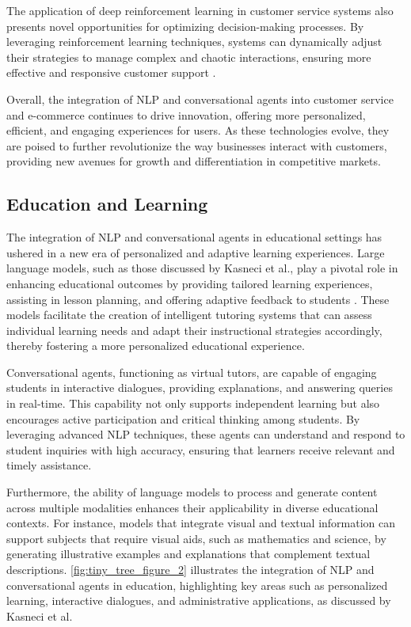 The application of deep reinforcement learning in customer service systems also presents novel opportunities for optimizing decision-making processes. By leveraging reinforcement learning techniques, systems can dynamically adjust their strategies to manage complex and chaotic interactions, ensuring more effective and responsive customer support \cite{vashishtha2019restoringchaosusingdeep}.



Overall, the integration of NLP and conversational agents into customer service and e-commerce continues to drive innovation, offering more personalized, efficient, and engaging experiences for users. As these technologies evolve, they are poised to further revolutionize the way businesses interact with customers, providing new avenues for growth and differentiation in competitive markets.




\subsection{Education and Learning} \label{subsec:Education and Learning}

The integration of NLP and conversational agents in educational settings has ushered in a new era of personalized and adaptive learning experiences. Large language models, such as those discussed by Kasneci et al., play a pivotal role in enhancing educational outcomes by providing tailored learning experiences, assisting in lesson planning, and offering adaptive feedback to students \cite{kasneci2023chatgpt}. These models facilitate the creation of intelligent tutoring systems that can assess individual learning needs and adapt their instructional strategies accordingly, thereby fostering a more personalized educational experience.

Conversational agents, functioning as virtual tutors, are capable of engaging students in interactive dialogues, providing explanations, and answering queries in real-time. This capability not only supports independent learning but also encourages active participation and critical thinking among students. By leveraging advanced NLP techniques, these agents can understand and respond to student inquiries with high accuracy, ensuring that learners receive relevant and timely assistance.

Furthermore, the ability of language models to process and generate content across multiple modalities enhances their applicability in diverse educational contexts. For instance, models that integrate visual and textual information can support subjects that require visual aids, such as mathematics and science, by generating illustrative examples and explanations that complement textual descriptions. \autoref{fig:tiny_tree_figure_2} illustrates the integration of NLP and conversational agents in education, highlighting key areas such as personalized learning, interactive dialogues, and administrative applications, as discussed by Kasneci et al.

